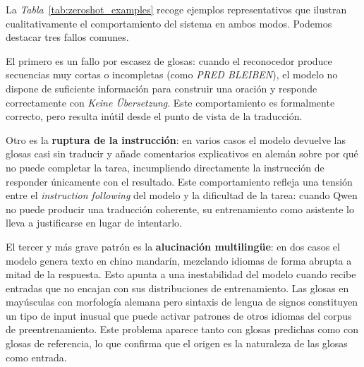 La \textit{Tabla}~\ref{tab:zeroshot_examples} recoge ejemplos representativos que ilustran cualitativamente el comportamiento del sistema en ambos modos.
Podemos destacar tres fallos comunes.

El primero es un fallo por escasez de glosas: cuando el reconocedor produce secuencias muy cortas o incompletas (como \textit{PRED BLEIBEN}), el modelo no dispone de suficiente información para construir una oración y responde correctamente con \textit{Keine Übersetzung}.
Este comportamiento es formalmente correcto, pero resulta inútil desde el punto de vista de la traducción.

Otro es la \textbf{ruptura de la instrucción}: en varios casos el modelo devuelve las glosas casi sin traducir y añade comentarios explicativos en alemán sobre por qué no puede completar la tarea, incumpliendo directamente la instrucción de responder únicamente con el resultado.
Este comportamiento refleja una tensión entre el \textit{instruction following} del modelo y la dificultad de la tarea: cuando Qwen no puede producir una traducción coherente, su entrenamiento como asistente lo lleva a justificarse en lugar de intentarlo.

El tercer y más grave patrón es la \textbf{alucinación multilingüe}: en dos casos el modelo genera texto en chino mandarín, mezclando idiomas de forma abrupta a mitad de la respuesta.
Esto apunta a una inestabilidad del modelo cuando recibe entradas que no encajan con sus distribuciones de entrenamiento. Las glosas en mayúsculas con morfología alemana pero sintaxis de lengua de signos constituyen un tipo de input inusual que puede activar patrones de otros idiomas del corpus de preentrenamiento.
Este problema aparece tanto con glosas predichas como con glosas de referencia, lo que confirma que el origen es la naturaleza de las glosas como entrada.

